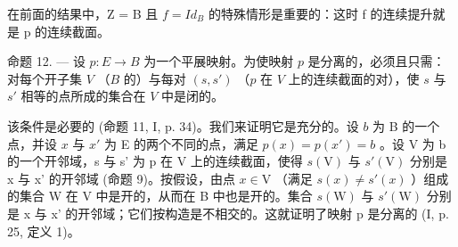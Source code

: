 在前面的结果中，Z = B 且 \(f = Id_{B}\) 的特殊情形是重要的：这时 f 的连续提升就是 p 的连续截面。

命题 12. --- 设 \(p \colon E \to B\) 为一个平展映射。为使映射 \(p\) 是分离的，必须且只需：对每个开子集 \(V\) （\(B\) 的）与每对 \((s, s')\) （\(p\) 在 \(V\) 上的连续截面的对），使 \(s\) 与 \(s'\) 相等的点所成的集合在 \(V\) 中是闭的。

该条件是必要的 (命题 11, I, p. 34)。我们来证明它是充分的。设 \(b\) 为 B 的一个点，并设 \(x\) 与 \(x'\) 为 E 的两个不同的点，满足 \(p(x) = p(x') = b\) 。设 V 为 b 的一个开邻域，s 与 s' 为 p 在 V 上的连续截面，使得 \(s(\mathrm{V})\) 与 \(s'(\mathrm{V})\) 分别是 x 与 x' 的开邻域 (命题 9)。按假设，由点 \(x \in \mathrm{V}\) （满足 \(s(x) \ne s'(x)\) ）组成的集合 W 在 V 中是开的，从而在 B 中也是开的。集合 \(s(\mathrm{W})\) 与 \(s'(\mathrm{W})\) 分别是 x 与 x' 的开邻域；它们按构造是不相交的。这就证明了映射 p 是分离的 (I, p. 25, 定义 1)。
